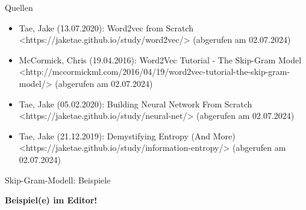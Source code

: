 \documentclass{beamer}
\begin{document}
\begin{frame}[t]{Quellen}
	\begin{itemize}
		\item Tae, Jake (13.07.2020): Word2vec from Scratch <https://jaketae.github.io/study/word2vec/> (abgerufen am 02.07.2024)
		\item McCormick, Chris (19.04.2016): Word2Vec Tutorial - The Skip-Gram Model <http://mccormickml.com/2016/04/19/word2vec-tutorial-the-skip-gram-model/> (abgerufen am 02.07.2024)
		\item Tae, Jake (05.02.2020): Building Neural Network From Scratch <https://jaketae.github.io/study/neural-net/> (abgerufen am 02.07.2024)
		\item Tae, Jake (21.12.2019): Demystifying Entropy (And More) <https://jaketae.github.io/study/information-entropy/> (abgerufen am 02.07.2024)
	\end{itemize}
\end{frame}


\begin{frame}[c]{Skip-Gram-Modell: Beispiele}
	\begin{center}\Large{\textbf{Beispiel(e) im Editor!}}\end{center}
\end{frame}
\end{document}
